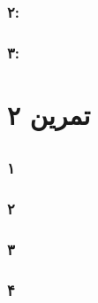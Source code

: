 \documentclass[]{exam}
\begin{document}
\subsubsection*{۲:}

\subsubsection*{۳:}


\section*{تمرین ۲}


\subsection*{\color{blue}{جواب}}
\subsubsection*{۱}

\subsubsection*{۲}

\subsubsection*{۳}

\subsubsection*{۴}


\end{document}
